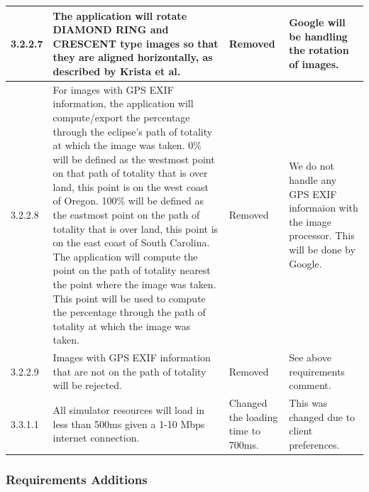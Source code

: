 \documentclass[10pt, onecolumn, draftclsnofoot, letterpaper, compsoc]{IEEEtran}
\begin{document}
\begin{longtable}{| p{} | p{} | p{} | p{} |}
    3.2.2.7 &
    The application will rotate DIAMOND RING and CRESCENT type images so that
    they are aligned horizontally, as described by Krista et al. &
	Removed &
	Google will be handling the rotation of images.
	\\ \hline

    3.2.2.8 &
    For images with GPS EXIF information, the application will compute/export
    the percentage through the
    eclipse’s path of totality at which the image was taken. 0\% will be
    defined as the westmost point on that
    path of totality that is over land, this point is on the west coast of
    Oregon. 100\% will be defined as the
    eastmost point on the path of totality that is over land, this point is
    on the east coast of South Carolina.
    The application will compute the point on the path of totality nearest
    the point where the image was taken.
    This point will be used to compute the percentage through the path of
    totality at which the image was
    taken. &
	Removed &
	We do not handle any GPS EXIF informaion with the image processor. This will be done by Google.
	\\ \hline

    3.2.2.9 &
	Images with GPS EXIF information that are not on the path of totality will be rejected. &
	Removed &
	See above requirements comment.
	\\ \hline

    3.3.1.1 &
	All simulator resources will load in less than 500ms given a 1-10 Mbps internet connection. &
	Changed the loading time to 700ms. &
    This was changed due to client preferences.
	\\ \hline

\end{longtable}

\subsubsection{Requirements Additions}
\end{document}
